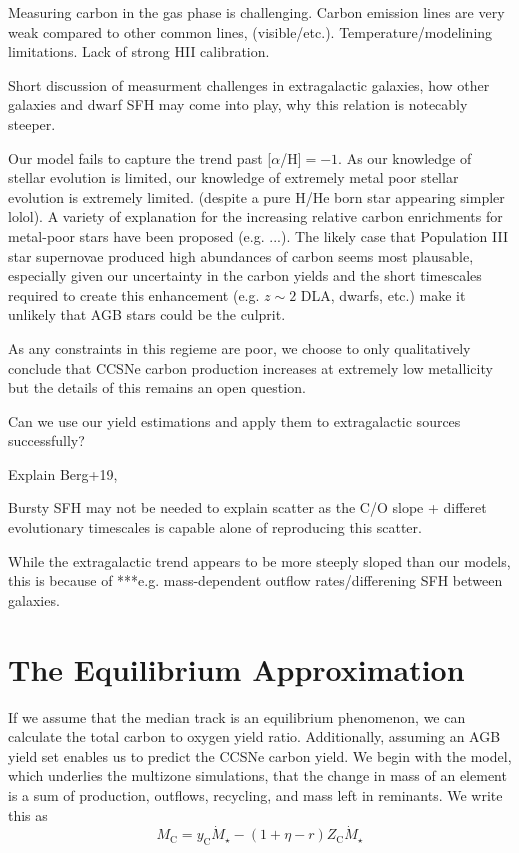 \documentclass[12pt,oneside]{book}
\begin{document}
Measuring carbon in the gas phase is challenging. Carbon emission lines are
very weak compared to other common lines, (visible/etc.).
Temperature/modelining limitations. Lack of strong HII calibration. 

Short discussion of measurment challenges in extragalactic galaxies, how other galaxies and dwarf SFH may come into play, why this relation is notecably steeper.

Our model fails to capture the trend past [$\alpha$/H]$=-1$. As our knowledge
of stellar evolution is limited, our knowledge of extremely metal poor stellar
evolution is extremely limited. (despite a pure H/He born star appearing
simpler lolol). A variety of explanation for the increasing relative carbon
enrichments for metal-poor stars have been proposed (e.g. ...). The likely case
that Population III star supernovae produced high abundances of carbon seems
most plausable, especially given our uncertainty in the carbon yields and the
short timescales required to create this enhancement (e.g. $z\sim 2$ DLA,
dwarfs, etc.) make it unlikely that AGB stars could be the culprit. 

As any constraints in this regieme are poor, we choose to only qualitatively
conclude that CCSNe carbon production increases at extremely low metallicity
but the details of this remains an open question.


Can we use our yield estimations and apply them to extragalactic sources successfully? 

Explain Berg+19,

Bursty SFH may not be needed to explain scatter as the C/O slope + differet evolutionary timescales is capable alone of reproducing this scatter.

While the extragalactic trend appears to be more steeply sloped than our models, this is because of ***e.g. mass-dependent outflow rates/differening SFH between galaxies. 

\chapter{The Equilibrium Approximation}\label{sec:equilibrium}
If we assume that the median track is an equilibrium phenomenon, we can calculate the total carbon to oxygen yield ratio. Additionally, assuming an AGB yield set enables us to predict the CCSNe carbon yield.  
We begin with the model, which underlies the multizone simulations, that the change in mass of an element is a sum of production, outflows, recycling, and mass left in reminants. We write this as
\begin{equation}
M_\text{C} = y_\text{C} \dot{M}_\star - (1 + \eta - r) Z_\text{C} \dot{M}_\star
\end{equation}
\end{document}
